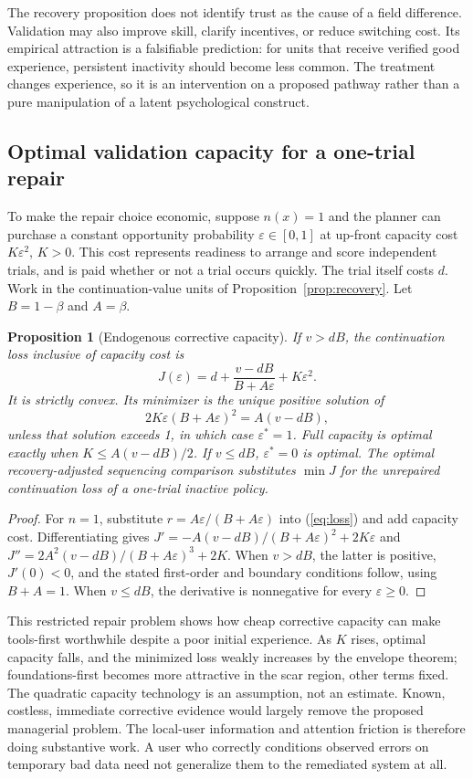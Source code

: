 \documentclass[11pt]{article}
\newtheorem{proposition}{Proposition}
\begin{document}
The recovery proposition does not identify trust as the cause of a field difference. Validation may also improve skill, clarify incentives, or reduce switching cost. Its empirical attraction is a falsifiable prediction: for units that receive verified good experience, persistent inactivity should become less common. The treatment changes experience, so it is an intervention on a proposed pathway rather than a pure manipulation of a latent psychological construct.

\subsection{Optimal validation capacity for a one-trial repair}
To make the repair choice economic, suppose $n(x)=1$ and the planner can purchase a constant opportunity probability $\varepsilon\in[0,1]$ at up-front capacity cost $K\varepsilon^2$, $K>0$. This cost represents readiness to arrange and score independent trials, and is paid whether or not a trial occurs quickly. The trial itself costs $d$. Work in the continuation-value units of Proposition~\ref{prop:recovery}. Let $B=1-\beta$ and $A=\beta$.
\begin{proposition}[Endogenous corrective capacity]\label{prop:capacity}
If $v>dB$, the continuation loss inclusive of capacity cost is
\begin{equation}
 J(\varepsilon)=d+\frac{v-dB}{B+A\varepsilon}+K\varepsilon^2.
\end{equation}
It is strictly convex. Its minimizer is the unique positive solution of
\begin{equation}
 2K\varepsilon(B+A\varepsilon)^2=A(v-dB),
\end{equation}
unless that solution exceeds 1, in which case $\varepsilon^*=1$. Full capacity is optimal exactly when $K\leq A(v-dB)/2$. If $v\leq dB$, $\varepsilon^*=0$ is optimal. The optimal recovery-adjusted sequencing comparison substitutes $\min J$ for the unrepaired continuation loss of a one-trial inactive policy.
\end{proposition}
\begin{proof}
For $n=1$, substitute $r=A\varepsilon/(B+A\varepsilon)$ into (\ref{eq:loss}) and add capacity cost. Differentiating gives $J'=-A(v-dB)/(B+A\varepsilon)^2+2K\varepsilon$ and $J''=2A^2(v-dB)/(B+A\varepsilon)^3+2K$. When $v>dB$, the latter is positive, $J'(0)<0$, and the stated first-order and boundary conditions follow, using $B+A=1$. When $v\leq dB$, the derivative is nonnegative for every $\varepsilon\geq0$.
\end{proof}
This restricted repair problem shows how cheap corrective capacity can make tools-first worthwhile despite a poor initial experience. As $K$ rises, optimal capacity falls, and the minimized loss weakly increases by the envelope theorem; foundations-first becomes more attractive in the scar region, other terms fixed. The quadratic capacity technology is an assumption, not an estimate. Known, costless, immediate corrective evidence would largely remove the proposed managerial problem. The local-user information and attention friction is therefore doing substantive work. A user who correctly conditions observed errors on temporary bad data need not generalize them to the remediated system at all.
\end{document}
